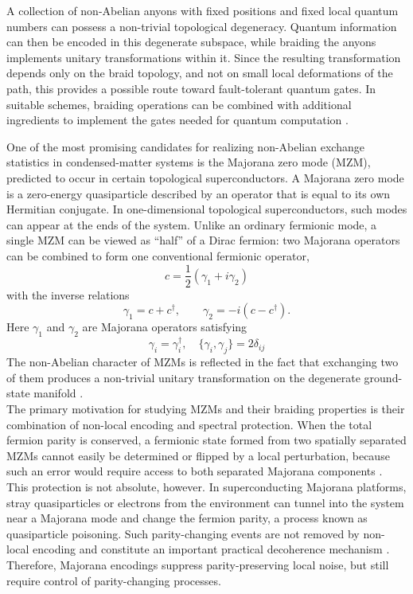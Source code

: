 A collection of non-Abelian anyons with fixed positions and fixed local quantum numbers can possess a non-trivial topological degeneracy. Quantum information can then be encoded in this degenerate subspace, while braiding the anyons implements unitary transformations within it. Since the resulting transformation depends only on the braid topology, and not on small local deformations of the path, this provides a possible route toward fault-tolerant quantum gates. In suitable schemes, braiding operations can be combined with additional ingredients to implement the gates needed for quantum computation \cite{sarmaMajoranaZeroModes2015}.


One of the most promising candidates for realizing non-Abelian exchange statistics in condensed-matter systems is the Majorana zero mode (MZM), predicted to occur in certain topological superconductors. A Majorana zero mode is a zero-energy quasiparticle described by an operator that is equal to its own Hermitian conjugate. In one-dimensional topological superconductors, such modes can appear at the ends of the system. Unlike an ordinary fermionic mode, a single MZM can be viewed as ``half'' of a Dirac fermion: two Majorana operators can be combined to form one conventional fermionic operator,
\begin{equation}
    c = \frac{1}{2}(\gamma_1 + i\gamma_2)
\end{equation}
with the inverse relations
\begin{equation}
    \gamma_1 = c + c^\dagger, \qquad \gamma_2 = -i(c-c^\dagger).
\end{equation}
Here $\gamma_1$ and $\gamma_2$ are Majorana operators satisfying
\begin{equation}
    \gamma_i = \gamma_i^\dagger, \quad \{\gamma_i, \gamma_j\} = 2\delta_{ij}
\end{equation}
The non-Abelian character of MZMs is reflected in the fact that exchanging two of them produces a non-trivial unitary transformation on the degenerate ground-state manifold \cite{sarmaMajoranaZeroModes2015}.\\ 
The primary motivation for studying MZMs and their braiding properties is their combination of non-local encoding and spectral protection. When the total fermion parity is conserved, a fermionic state formed from two spatially separated MZMs cannot easily be determined or flipped by a local perturbation, because such an error would require access to both separated Majorana components \cite{nayakNonAbelianAnyonsTopological2008}. This protection is not absolute, however. In superconducting Majorana platforms, stray quasiparticles or electrons from the environment can tunnel into the system near a Majorana mode and change the fermion parity, a process known as quasiparticle poisoning. Such parity-changing events are not removed by non-local encoding and constitute an important practical decoherence mechanism \cite{sarmaMajoranaZeroModes2015,beenakkerSearchNonAbelianMajorana2020}. Therefore, Majorana encodings suppress parity-preserving local noise, but still require control of parity-changing processes.

